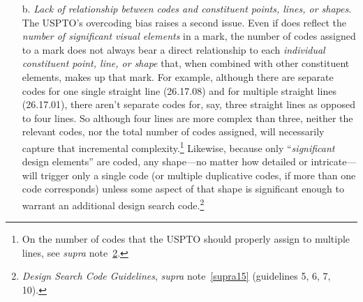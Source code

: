 \documentclass[letterpaper, 11pt, oneside]{article}
\begin{document}
\begin{enumerate}
Coders are also instructed to code visual elements in applicants' mark drawings \emph{even where applicants expressly disclaim those elements}. Such elements are typically shown in dashed lines. For example, adidas's application for the mark \texttt{[image: RN\_3029127\_drawing]},\footnote{Reg. No. 3029127.} which consists of adidas's three-stripe trade dress on a garment, expressly disclaims the garment on which the mark is shown, because adidas is claiming the design \emph{on} the garment, not the garment itself. Yet in addition to the design search code for straight lines (26.17.01), the USPTO also assigned this mark the design search code for jackets (09.03.01). This makes sense from the perspective of providing actual notice to potential infringers. The disclaimed matter is essential, because it is the commercial context in which adidas uses the mark. However, from the perspective of measuring mark complexity, the presence of two codes suggests that there are two significant elements in the mark when, arguably, we should focus only on the claimed matter, the three stripes, which amount to one element (or perhaps three distinct elements).\footnote{\label{supra26} Indeed, per its own guidance, the USPTO should actually have coded the adidas three-stripe mark for \emph{both} three lines \emph{and} a single line. \textit{See supra} note~\ref{supra25}.} Viewed from this angle, coding disclaimed matter contributes to a general tendency to overcode, rather than undercode. The upshot is that the relationship between a mark's significant design elements and the number of design search codes it has is far from perfectly linear. 

\item[b.] \textit{Lack of relationship between codes and constituent points, lines, or shapes}. The USPTO's overcoding bias raises a second issue. Even if does reflect the \emph{number of significant visual elements} in a mark, the number of codes assigned to a mark does not always bear a direct relationship to each \emph{individual constituent point, line, or shape} that, when combined with other constituent elements, makes up that mark. For example, although there are separate codes for one single straight line (26.17.08) and for multiple straight lines (26.17.01), there aren't separate codes for, say, three straight lines as opposed to four lines. So although four lines are more complex than three, neither the relevant codes, nor the total number of codes assigned, will necessarily capture that incremental complexity.\footnote{On the number of codes that the USPTO should properly assign to multiple lines, see \textit{supra} note~\ref{supra26}.} Likewise, because only ``\emph{significant} design elements'' are coded, any shape—no matter how detailed or intricate—will trigger only a single code (or multiple duplicative codes, if more than one code corresponds) unless some aspect of that shape is significant enough to warrant an additional design search code.\footnote{\textit{Design Search Code Guidelines}, \textit{supra} note~\ref{supra15} (guidelines 5, 6, 7, 10).}


\end{enumerate}
\end{document}
